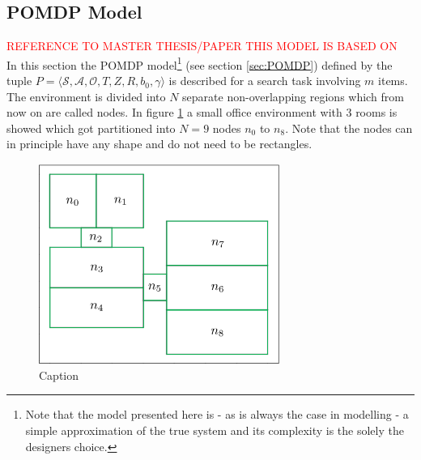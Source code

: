 \subsection{POMDP Model}\label{subsec:POMDPmodel}
\textcolor{red}{REFERENCE TO MASTER THESIS/PAPER THIS MODEL IS BASED ON}\\
In this section the POMDP model\footnote{Note that the model presented here is - as is always the case in modelling - a simple approximation of the true system and its complexity is the solely the designers choice.} (see section \ref{sec:POMDP}) defined by the tuple $P = \langle \mathcal{S}, \mathcal{A}, \mathcal{O}, T, Z, R, b_0, \gamma \rangle$ is described for a search task involving $m$ items. The environment is divided into $N$ separate non-overlapping regions which from now on are called nodes. In figure \ref{fig:nodes} a small office environment with 3 rooms is showed which got partitioned into $N=9$ nodes $n_0$ to $n_8$. Note that the nodes can in principle have any shape and do not need to be rectangles.
\begin{figure}
    \centering
    \includegraphics[width=0.7\textwidth]{Report/images/envsmall_l2.png}
    \caption{Caption}
    \label{fig:nodes}
\end{figure}
